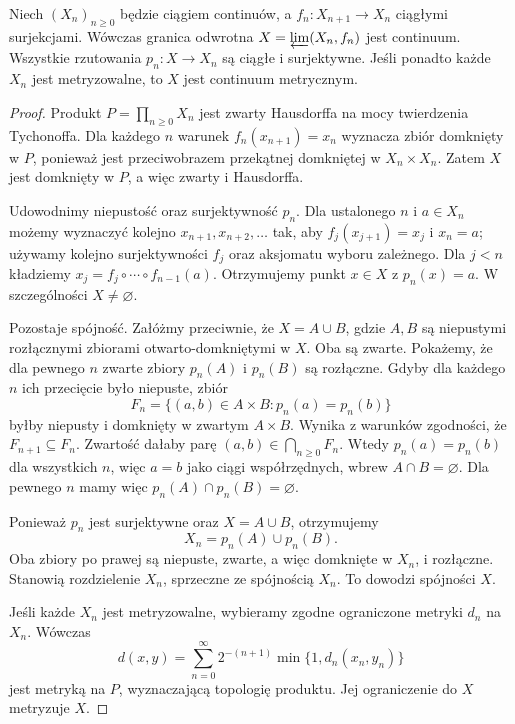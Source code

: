 \begin{twierdzenie}
\label{thm:topog25-inverse-connected}
Niech \((X_n)_{n\ge0}\) będzie
ciągiem continuów, a
\(f_n\colon X_{n+1}\to X_n\)
ciągłymi surjekcjami.
Wówczas granica odwrotna
\(X=\varprojlim(X_n,f_n)\)
jest continuum.
Wszystkie rzutowania
\(p_n\colon X\to X_n\)
są ciągłe i surjektywne.
Jeśli ponadto każde \(X_n\)
jest metryzowalne,
to \(X\) jest continuum metrycznym.
\end{twierdzenie}
\begin{proof}
Produkt \(P=\prod_{n\ge0}X_n\)
jest zwarty Hausdorffa na mocy
twierdzenia Tychonoffa.
Dla każdego \(n\) warunek
\(f_n(x_{n+1})=x_n\)
wyznacza zbiór domknięty w \(P\),
ponieważ jest przeciwobrazem
przekątnej domkniętej w
\(X_n\times X_n\).
Zatem \(X\) jest domknięty
w \(P\), a więc zwarty
i Hausdorffa.

Udowodnimy niepustość
oraz surjektywność \(p_n\).
Dla ustalonego \(n\) i
\(a\in X_n\) możemy wyznaczyć
kolejno \(x_{n+1},x_{n+2},\ldots\)
tak, aby
\(f_j(x_{j+1})=x_j\)
i \(x_n=a\); używamy kolejno
surjektywności \(f_j\)
oraz aksjomatu wyboru zależnego.
Dla \(j<n\) kładziemy
\(x_j=f_j\circ\cdots\circ
f_{n-1}(a)\).
Otrzymujemy punkt \(x\in X\)
z \(p_n(x)=a\).
W szczególności \(X\neq\varnothing\).

Pozostaje spójność.
Załóżmy przeciwnie, że
\(X=A\cup B\), gdzie \(A,B\)
są niepustymi rozłącznymi
zbiorami otwarto-domkniętymi
w \(X\). Oba są zwarte.
Pokażemy, że dla pewnego \(n\)
zwarte zbiory \(p_n(A)\)
i \(p_n(B)\) są rozłączne.
Gdyby dla każdego \(n\)
ich przecięcie było niepuste,
zbiór
\[
 F_n=\{(a,b)\in A\times B:p_n(a)=p_n(b)\}
\]
byłby niepusty i domknięty
w zwartym \(A\times B\).
Wynika z warunków zgodności,
że \(F_{n+1}\subseteq F_n\).
Zwartość dałaby parę
\((a,b)\in\bigcap_{n\ge0}F_n\).
Wtedy \(p_n(a)=p_n(b)\)
dla wszystkich \(n\), więc
\(a=b\) jako ciągi współrzędnych,
wbrew \(A\cap B=\varnothing\).
Dla pewnego \(n\)
mamy więc \(p_n(A)\cap p_n(B)=\varnothing\).

Ponieważ \(p_n\) jest surjektywne
oraz \(X=A\cup B\), otrzymujemy
\[
 X_n=p_n(A)\cup p_n(B).
\]
Oba zbiory po prawej są
niepuste, zwarte, a więc
domknięte w \(X_n\), i rozłączne.
Stanowią rozdzielenie \(X_n\),
sprzeczne ze spójnością \(X_n\).
To dowodzi spójności \(X\).

Jeśli każde \(X_n\) jest
metryzowalne, wybieramy zgodne
ograniczone metryki \(d_n\)
na \(X_n\). Wówczas
\[
 d(x,y)=\sum_{n=0}^{\infty}
  2^{-(n+1)}\min\{1,d_n(x_n,y_n)\}
\]
jest metryką na \(P\),
wyznaczającą topologię produktu.
Jej ograniczenie do \(X\)
metryzuje \(X\).
\end{proof}

